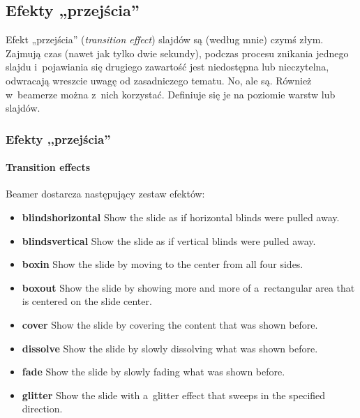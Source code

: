\documentclass[12pt,aspectratio=169,ignorenonframetext]{beamer}
\begin{document}
\subsection{Efekty „przejścia”}

Efekt „przejścia” (\emph{transition effect}) slajdów są (według mnie) czymś złym.
Zajmują czas (nawet jak tylko dwie sekundy), podczas procesu znikania jednego slajdu i~pojawiania się drugiego zawartość jest niedostępna lub nieczytelna, odwracają wreszcie uwagę od zasadniczego tematu.
No, ale są.
Również w~beamerze można z~nich korzystać. Definiuje się je na poziomie warstw lub slajdów.

\begin{frame}
 \frametitle<presentation>{Efekty ,,przejścia''}
 \framesubtitle{Transition effects}
 \hypertarget{efekty}{Beamer} dostarcza następujący zestaw efektów:
 \begin{itemize}
  \item<2>
        \textbf{blindshorizontal}
        Show the slide as if horizontal blinds were pulled away.
  \item<3>
        \textbf{blindsvertical}
        Show the slide as if vertical blinds were pulled away.
  \item<4>
        \textbf{boxin}
        Show the slide by moving to the center from all four sides.
  \item<5>
        \textbf{boxout}
        Show the slide by showing more and more of a~rectangular area that is centered on the slide center.
  \item<6>
        \textbf{cover}
        Show the slide by covering the content that was shown before.
  \item<7>
        \textbf{dissolve}
        Show the slide by slowly dissolving what was shown before.
  \item<8>
        \textbf{fade}
        Show the slide by slowly fading what was shown before.
  \item<9>
        \textbf{glitter}
        Show the slide with a~glitter effect that sweeps in the specified direction.
 \end{itemize}
\end{frame}
\end{document}
